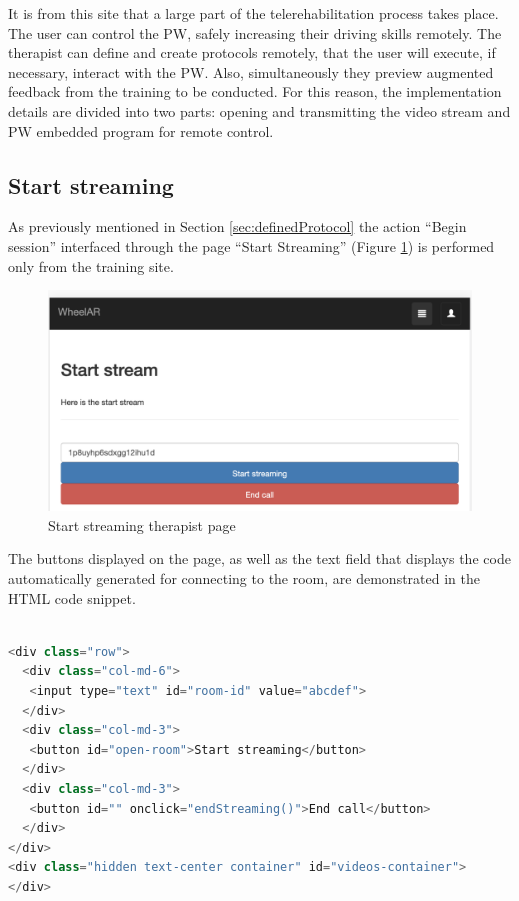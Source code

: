 It is from this site that a large part of the telerehabilitation process takes place. The user can control the PW, safely increasing their driving skills remotely.  The therapist can define and create protocols remotely,  that the user will execute, if necessary, interact with the PW. Also, simultaneously they preview augmented feedback from the training to be conducted. For this reason, the implementation details are divided into two parts: opening and transmitting the video stream and PW embedded program for remote control.

\subsection{Start streaming}
\label{sec:startStreaming}

As previously mentioned in Section \ref{sec:definedProtocol} the action ``Begin session'' interfaced through the page ``Start Streaming'' (Figure \ref{fig:tStartStream}) is performed only from the training site. 

\begin{figure}[!hbt]
\begin{center}
\includegraphics[width=0.7\linewidth]{img/cap5/tStartStream}
\caption{Start streaming therapist page} \label{fig:tStartStream}
\end{center}
\end{figure}

The buttons displayed on the page, as well as the text field that displays the code automatically generated for connecting to the room, are demonstrated in the HTML code snippet.


\begin{lstlisting}[frame=single,language=Java]  % Start your code-block

<div class="row">
  <div class="col-md-6">
   <input type="text" id="room-id" value="abcdef">
  </div>
  <div class="col-md-3">
   <button id="open-room">Start streaming</button>
  </div>
  <div class="col-md-3">
   <button id="" onclick="endStreaming()">End call</button>
  </div>
</div>
<div class="hidden text-center container" id="videos-container">
</div>

\end{lstlisting}


